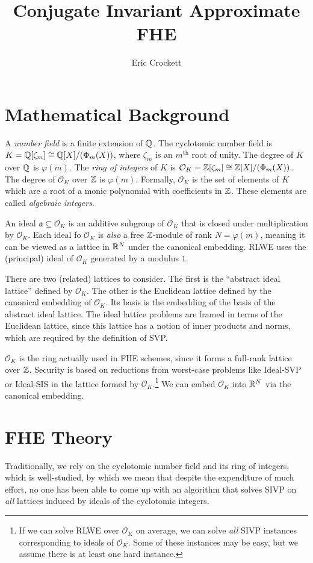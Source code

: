 \documentclass[../fheimpl.tex]{subfiles}
\title{Conjugate Invariant Approximate FHE}
\author{Eric Crockett}
\begin{document}
\ifcompileasbook
\else
\maketitle
\listoffixmes
\fi

\section{Mathematical Background}
A \emph{number field} is a finite extension of $\mathbb{Q}$. The cyclotomic number field is $K=\mathbb{Q}[\zeta_m]\cong\mathbb{Q}[X]/(\Phi_m(X))$, where $\zeta_m$ is an $m^\mathrm{th}$ root of unity. The degree of $K$ over $\mathbb{Q}$ is $\varphi(m)$. The \emph{ring of integers} of $K$ is $\mathcal{O}_K=\mathbb{Z}[\zeta_m]\cong \mathbb{Z}[X]/(\Phi_m(X))$. The degree of $\mathcal{O}_K$ over $\mathbb{Z}$ is $\varphi(m)$. Formally, $\mathcal{O}_K$ is the set of elements of $K$ which are a root of a monic polynomial with coefficients in $\mathbb{Z}$. These elements are called \emph{algebraic integers}.

An ideal $\mathfrak{a}\subseteq\mathcal{O}_K$ is an additive subgroup of $\mathcal{O}_K$ that is closed under multiplication by $\mathcal{O}_K$. Each ideal fo $\mathcal{O}_K$ is \emph{also} a free $\mathbb{Z}$-module of rank $N=\varphi(m)$, meaning it can be viewed as a lattice in $\mathbb{R}^N$ under the canonical embedding. RLWE uses the (principal) ideal of $\mathcal{O}_K$ generated by a modulus $1$.

There are two (related) lattices to consider. The first is the ``abstract ideal lattice'' defined by $\mathcal{O}_K$. The other is the Euclidean lattice defined by the canonical embedding of $\mathcal{O}_K$. Its basis is the embedding of the basis of the abstract ideal lattice. The ideal lattice problems are framed in terms of the Euclidean lattice, since this lattice has a notion of inner products and norms, which are required by the definition of SVP.

$\mathcal{O}_K$ is the ring actually used in FHE schemes, since it forms a full-rank lattice over $\mathbb{Z}$. Security is based on reductions from worst-case problems like Ideal-SVP or Ideal-SIS in the lattice formed by $\mathcal{O}_K$.\footnote{If we can solve RLWE over $\mathcal{O}_K$ on average, we can solve \emph{all} SIVP instances corresponding to ideals of $\mathcal{O}_K$. Some of these instances may be easy, but we assume there is at least one hard instance.} We can embed $\mathcal{O}_K$ into $\mathbb{R}^N$ via the canonical embedding.

\section{FHE Theory}
Traditionally, we rely on the cyclotomic number field and its ring of integers, which is well-studied, by which we mean that despite the expenditure of much effort, no one has been able to come up with an algorithm that solves SIVP on \emph{all} lattices induced by ideals of the cyclotomic integers.
\end{document}
